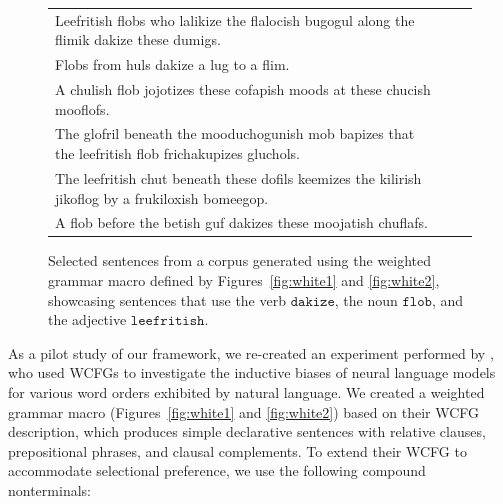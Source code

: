 \documentclass[11pt,a4paper]{article}
\renewcommand{\bnfts}[1]{\mathtt{#1}}
\begin{document}
\begin{figure}[p]
\centering
\begin{tabular}{lll} 
Leefritish flobs who lalikize the flalocish bugogul along the flimik dakize these dumigs.\\
Flobs from huls dakize a lug to a flim.\\
A chulish flob jojotizes these cofapish moods at these chucish mooflofs.\\
The glofril beneath the mooduchogunish mob bapizes that the leefritish flob frichakupizes gluchols.\\
The leefritish chut beneath these dofils keemizes the kilirish jikoflog by a frukiloxish bomeegop.\\
A flob before the betish guf dakizes these moojatish chuflafs.
\end{tabular}
\caption{Selected sentences from a corpus generated using the weighted grammar macro defined by Figures~\ref{fig:white1} and \ref{fig:white2}, showcasing sentences that use the verb $\bnfts{dakize}$, the noun $\bnfts{flob}$, and the adjective $\bnfts{leefritish}$. \label{fig:white3}}
\end{figure}


As a pilot study of our framework, we re-created an experiment performed by \citet{white-cotterell-2021-examining}, who used WCFGs to investigate the inductive biases of neural language models for various word orders exhibited by natural language. We created a weighted grammar macro (Figures~\ref{fig:white1} and \ref{fig:white2}) based on their WCFG description, which produces simple declarative sentences with relative clauses, prepositional phrases, and clausal complements. To extend their WCFG to accommodate selectional preference, we use the following compound nonterminals:
\end{document}
